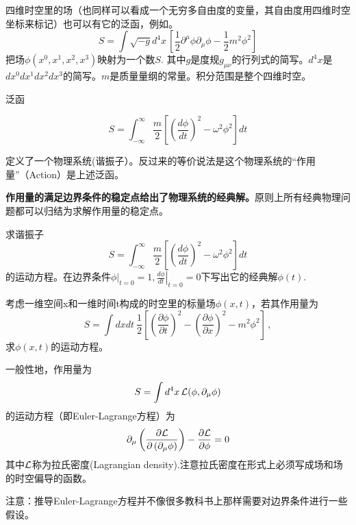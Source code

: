 \documentclass[CJK]{beamer}
\begin{document}
\begin{frame}
\bch
四维时空里的场（也同样可以看成一个无穷多自由度的变量，其自由度用四维时空坐标来标记）也可以有它的泛函，例如。
\ech
\bex
$$ S = \int \sqrt{-g}d^4x\, \left[\frac{1}{2}\partial^\mu\phi \partial_\mu\phi - \frac{1}{2}m^2\phi^2\right]$$
\bch
把场$\phi(x^0,x^1, x^2, x^3)$映射为一个数$S$. 其中$g$是度规$g_{\mu\nu}$的行列式的简写。$d^4x$是$dx^0dx^1dx^2dx^3$的简写。$m$是质量量纲的常量。积分范围是整个四维时空。
\ech
\eex
\end{frame}

\begin{frame}
\bch
泛函

$$ S = \int_{-\infty}^\infty \frac{m}{2}\left[(\frac{d\phi}{dt})^2 - \omega^2\phi^2\right] dt$$

定义了一个物理系统(谐振子）。反过来的等价说法是这个物理系统的“作用量”（Action）是上述泛函。

\skipline
{\bf 作用量的满足边界条件的稳定点给出了物理系统的经典解。}原则上所有经典物理问题都可以归结为求解作用量的稳定点。
\ech

\end{frame}


\begin{frame}
\bch
求谐振子
$$ S = \int_{-\infty}^\infty \frac{m}{2}\left[(\frac{d\phi}{dt})^2 - \omega^2\phi^2\right] dt$$
的运动方程。在边界条件$\left.\phi\right\vert_{t=0} = 1, \left.\frac{d\phi}{dt}\right\vert_{t=0} = 0$下写出它的经典解$\phi(t)$.
\ech

\end{frame}


\begin{frame}
\bch
考虑一维空间x和一维时间t构成的时空里的标量场$\phi(x,t)$，若其作用量为
$$ S = \int dx dt \   \frac{1}{2} \left[\left(\frac{\partial \phi}{\partial t}\right)^2 - \left(\frac{\partial \phi}{\partial x}\right)^2 - m^2\phi^2\right]\, ,$$
求$\phi(x, t)$的运动方程。
\ech

\end{frame}


\begin{frame}
\bch
一般性地，作用量为
$$S = \int d^4x\,{\mathcal{L}}(\phi,\partial_\mu\phi)$$
的运动方程（即Euler-Lagrange方程）为
$$\partial_\mu\left(\frac{\partial {\mathcal{L}}}{\partial\left(\partial_\mu \phi\right)} \right)-\frac{\partial {\mathcal{L}}}{\partial \phi} = 0$$
其中${\mathcal{L}}$称为拉氏密度(Lagrangian density).注意拉氏密度在形式上必须写成场和场的时空偏导的函数。

\skipline
注意：推导Euler-Lagrange方程并不像很多教科书上那样需要对边界条件进行一些假设。
\ech
\end{frame}
\end{document}
